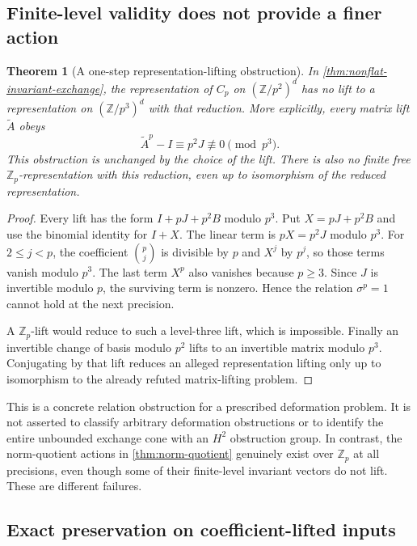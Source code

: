 \documentclass[11pt]{article}
\newtheorem{theorem}{Theorem}[section]
\theoremstyle{definition}
\theoremstyle{remark}
\begin{document}
\subsection{Finite-level validity does not provide a finer action}

\begin{theorem}[A one-step representation-lifting obstruction]\label{thm:one-step-group-lift}
In \cref{thm:nonflat-invariant-exchange}, the representation of $C_p$ on $(\mathbb Z/p^2)^d$ has no lift to a representation on $(\mathbb Z/p^3)^d$ with that reduction. More explicitly, every matrix lift $\widetilde A$ obeys
\[
 \boxed{\widetilde A^p-I\equiv p^2J\not\equiv0\pmod{p^3}.}
\]
This obstruction is unchanged by the choice of the lift. There is also no finite free $\mathbb Z_p$-representation with this reduction, even up to isomorphism of the reduced representation.
\end{theorem}
\begin{proof}
Every lift has the form $I+pJ+p^2B$ modulo $p^3$. Put $X=pJ+p^2B$ and use the binomial identity for $I+X$. The linear term is $pX=p^2J$ modulo $p^3$. For $2\leq j<p$, the coefficient $\binom pj$ is divisible by $p$ and $X^j$ by $p^j$, so those terms vanish modulo $p^3$. The last term $X^p$ also vanishes because $p\geq3$. Since $J$ is invertible modulo $p$, the surviving term is nonzero. Hence the relation $\sigma^p=1$ cannot hold at the next precision.

A $\mathbb Z_p$-lift would reduce to such a level-three lift, which is impossible. Finally an invertible change of basis modulo $p^2$ lifts to an invertible matrix modulo $p^3$. Conjugating by that lift reduces an alleged representation lifting only up to isomorphism to the already refuted matrix-lifting problem.
\end{proof}

This is a concrete relation obstruction for a prescribed deformation problem. It is not asserted to classify arbitrary deformation obstructions or to identify the entire unbounded exchange cone with an $H^2$ obstruction group. In contrast, the norm-quotient actions in \cref{thm:norm-quotient} genuinely exist over $\mathbb Z_p$ at all precisions, even though some of their finite-level invariant vectors do not lift. These are different failures.


\subsection{Exact preservation on coefficient-lifted inputs}
\end{document}
